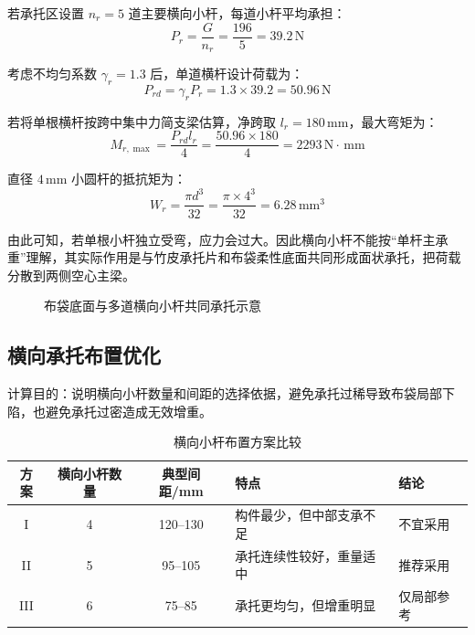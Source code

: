 \documentclass[UTF8,a4paper,12pt,fontset=none]{ctexart}
\numberwithin{equation}{section}
\numberwithin{figure}{section}
\numberwithin{table}{section}
\newcommand{\mm}{\,\mathrm{mm}}
\newcommand{\Nunit}{\,\mathrm{N}}
\begin{document}
若承托区设置 $n_r=5$ 道主要横向小杆，每道小杆平均承担：
\begin{equation}
  P_r=\frac{G}{n_r}=\frac{196}{5}=39.2\Nunit
\end{equation}

考虑不均匀系数 $\gamma_r=1.3$ 后，单道横杆设计荷载为：
\begin{equation}
  P_{rd}=\gamma_rP_r=1.3\times39.2=50.96\Nunit
\end{equation}

若将单根横杆按跨中集中力简支梁估算，净跨取 $l_r=180\mm$，最大弯矩为：
\begin{equation}
  M_{r,\max}=\frac{P_{rd}l_r}{4}=\frac{50.96\times180}{4}=2293\Nunit\cdot\mm
\end{equation}

直径 $4\mm$ 小圆杆的抵抗矩为：
\begin{equation}
  W_r=\frac{\pi d^3}{32}=\frac{\pi\times4^3}{32}=6.28\mm^3
\end{equation}

由此可知，若单根小杆独立受弯，应力会过大。因此横向小杆不能按“单杆主承重”理解，其实际作用是与竹皮承托片和布袋柔性底面共同形成面状承托，把荷载分散到两侧空心主梁。

\begin{figure}[H]
\centering
{}
\caption{布袋底面与多道横向小杆共同承托示意}
\label{fig:rod-support}
\end{figure}

\subsection{横向承托布置优化}
计算目的：说明横向小杆数量和间距的选择依据，避免承托过稀导致布袋局部下陷，也避免承托过密造成无效增重。

\begin{table}[H]
\centering
\caption{横向小杆布置方案比较}
\label{tab:crossbar-layout}
\begin{tabularx}{\linewidth}{c c c Y Y}
\toprule
方案 & 横向小杆数量 & 典型间距/mm & 特点 & 结论 \\
\midrule
I & 4 & 120--130 & 构件最少，但中部支承不足 & 不宜采用 \\
II & 5 & 95--105 & 承托连续性较好，重量适中 & 推荐采用 \\
III & 6 & 75--85 & 承托更均匀，但增重明显 & 仅局部参考 \\
\bottomrule
\end{tabularx}
\end{table}
\end{document}

